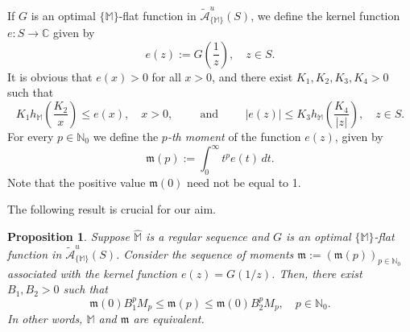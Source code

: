 \documentclass[11pt,a4paper]{article}
\theoremstyle{plain}
\newtheorem{prop}[theo]{Proposition}
\theoremstyle{definition}
\newcommand{\N}{\mathbb{N}}
\newcommand{\C}{\mathbb{C}}
\newcommand{\M}{\mathbb{M}}
\newcommand{\hM}{\widehat{\M}}
\newcommand{\mo}{\mathfrak{m}}
\begin{document}
If $G$ is an optimal $\{\M\}$-flat function in $\widetilde{\mathcal{A}}^u_{\{\M\}}(S)$, we define the kernel function $e\colon S\to\C$ given by
\begin{equation*}
e(z):=G\left(\frac{1}{z}\right),\quad z\in S.
\end{equation*}
It is obvious that $e(x)>0$ for all $x>0$, and there exist $K_1,K_2,K_3,K_4>0$ such that
\begin{equation}\label{eq.Bounds_e_sector}
K_1h_{\M}\left(\frac{K_2}{x}\right)\le e(x), \quad x>0, \hspace{1cm}\text{and}\hspace{1cm} |e(z)|\le K_3h_{\M}\left(\frac{K_4}{|z|}\right),\quad z\in S.
\end{equation}
For every $p\in\mathbb{N}_0$ we define the \emph{$p$-th moment} of the function $e(z)$, given by
\begin{equation*}
\mo(p):=\int_0^\infty t^{p}e(t)\,dt.
\end{equation*}
Note that the positive value $\mo(0)$ need not be equal to 1.

The following result is crucial for our aim.

\begin{prop}\label{prop.boundsMomentsSigmaEntre1y2}
Suppose $\hM$ is a regular sequence and $G$ is an optimal $\{\M\}$-flat function in $\widetilde{\mathcal{A}}^u_{\{\M\}}(S)$. Consider the sequence of moments $\mo:=(\mo(p))_{p\in\N_0}$ associated with the kernel function $e(z)=G(1/z)$. Then, there exist $B_1,B_2>0$ such that
\begin{equation}\label{eq.boundsMmomentsdc}
\mo(0)B_1^{p}M_p\le \mo(p)\le \mo(0)B_2^{p}M_p,\quad p\in\mathbb{N}_0.
\end{equation}
In other words, $\M$ and $\mo$ are equivalent.
\end{prop}
\end{document}
